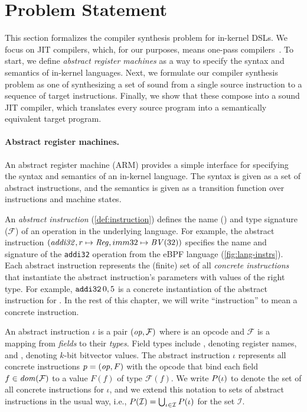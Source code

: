 \section{Problem Statement}\label{s:problem}

This section formalizes the compiler synthesis problem for in-kernel DSLs. We
focus on JIT compilers, which, for our purposes, means one-pass
compilers~\cite{engler:vcode}. To start, we define \emph{abstract register
machines} as a way to specify the syntax and semantics of in-kernel languages.
Next, we formulate our compiler synthesis problem as one of synthesizing a set
of sound \emph{\minicompilers} from a single source instruction to a sequence of
target instructions. Finally, we show that these \minicompilers compose into a
sound JIT compiler, which translates every source program into a semantically
equivalent target program.\tighten 


\paragraph{Abstract register machines.}

An abstract register machine (ARM) provides a simple interface for specifying
the syntax and semantics of an in-kernel language. The syntax is given as a set
of {abstract instructions}, and the semantics is given as a {transition
function} over instructions and machine {states}. 

An \emph{abstract instruction} (\autoref{def:instruction}) defines the name
() and type signature ($\mathcal{F}$) of an operation in the
underlying language. For example, the abstract instruction $(\mathit{addi32}, r
\mapsto \mathit{Reg}, imm32 \mapsto \mathit{BV}(32))$ specifies the name and signature of the
\texttt{addi32} operation from the eBPF language
(\autoref{fig:lang-instrs}). Each abstract instruction represents the (finite)
set of all \emph{concrete instructions} that instantiate the abstract
instruction's parameters with values of the right type. For example,
$\texttt{addi32}\, 0, 5$ is a concrete instantiation of the abstract instruction for
. In the rest of this chapter, we will write ``instruction'' to mean a
concrete instruction.\tighten

\begin{definition}\label{def:instruction}
  An \textup{abstract instruction} $\iota$ is a pair $(\mathit{op}, \mathcal{F})$ where
   is an opcode and $\mathcal{F}$ is a mapping from \emph{fields}
  to their \emph{types}. Field types include \Reg, denoting register names, and
  , denoting $k$-bit bitvector values. The abstract instruction $\iota$
  represents all \textup{concrete instructions} $p = (\mathit{op}, F)$ with the
  opcode  that bind each field $f\in \mathit{dom}(\mathcal{F})$ to a
  value $F(f)$ of type $\mathcal{F}(f)$. We write $P(\iota)$ to denote the
  set of all concrete instructions for $\iota$, and we extend this notation to
  sets of abstract instructions in the usual way, i.e.,
  $P(\mathcal{I})=\bigcup_{\iota\in\mathcal{I}}P(\iota)$ for the set
  $\mathcal{I}$.\tighten
\end{definition}

